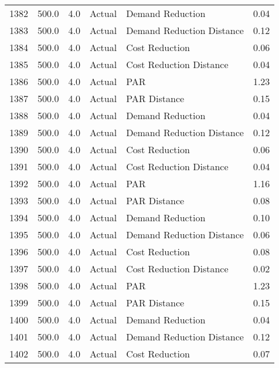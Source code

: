 \begin{longtable}{lrrllr}
1382 &        500.0 &     4.0 &         Actual &           Demand Reduction &   0.04 \\
1383 &        500.0 &     4.0 &         Actual &  Demand Reduction Distance &   0.12 \\
1384 &        500.0 &     4.0 &         Actual &             Cost Reduction &   0.06 \\
1385 &        500.0 &     4.0 &         Actual &    Cost Reduction Distance &   0.04 \\
1386 &        500.0 &     4.0 &         Actual &                        PAR &   1.23 \\
1387 &        500.0 &     4.0 &         Actual &               PAR Distance &   0.15 \\
1388 &        500.0 &     4.0 &         Actual &           Demand Reduction &   0.04 \\
1389 &        500.0 &     4.0 &         Actual &  Demand Reduction Distance &   0.12 \\
1390 &        500.0 &     4.0 &         Actual &             Cost Reduction &   0.06 \\
1391 &        500.0 &     4.0 &         Actual &    Cost Reduction Distance &   0.04 \\
1392 &        500.0 &     4.0 &         Actual &                        PAR &   1.16 \\
1393 &        500.0 &     4.0 &         Actual &               PAR Distance &   0.08 \\
1394 &        500.0 &     4.0 &         Actual &           Demand Reduction &   0.10 \\
1395 &        500.0 &     4.0 &         Actual &  Demand Reduction Distance &   0.06 \\
1396 &        500.0 &     4.0 &         Actual &             Cost Reduction &   0.08 \\
1397 &        500.0 &     4.0 &         Actual &    Cost Reduction Distance &   0.02 \\
1398 &        500.0 &     4.0 &         Actual &                        PAR &   1.23 \\
1399 &        500.0 &     4.0 &         Actual &               PAR Distance &   0.15 \\
1400 &        500.0 &     4.0 &         Actual &           Demand Reduction &   0.04 \\
1401 &        500.0 &     4.0 &         Actual &  Demand Reduction Distance &   0.12 \\
1402 &        500.0 &     4.0 &         Actual &             Cost Reduction &   0.07 \\

\end{longtable}

